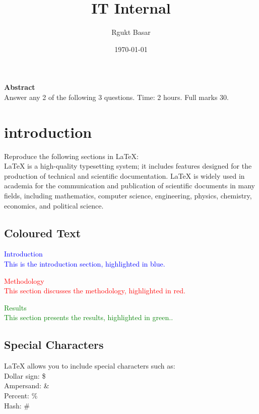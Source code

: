 \documentclass{article}
\title{IT Internal }
\author{Rgukt Basar}
\date{\today}
\begin{document}
	\maketitle
	\center \textbf{Abstract}\\
	
	Answer any 2 of the following 3 questions. Time: 2 hours. Full marks 30.
	
	\section{introduction}
	Reproduce the following sections in LaTeX:\\
	LaTeX is a high-quality typesetting system; it includes features designed for the production of technical
	and scientific documentation. LaTeX is widely used in academia for the communication and publication
	of scientific documents in many fields, including mathematics, computer science, engineering, physics,
	chemistry, economics, and political science.
	
	\subsection{Coloured Text}
	
	\large \textcolor{blue}{Introduction}\\
	
	\textcolor{blue}{This is the introduction section, highlighted in blue.}
	
	
	\large \textcolor{red}{Methodology}\\
	
	\textcolor{red}{This section discusses the methodology, highlighted in red.}
	
	
	\huge \textcolor{green}{Results}\\
	
	\small\textcolor{green}{This section presents the results, highlighted in green..}
	
	
	
	
	\subsection{Special Characters}
	LaTeX allows you to include special characters such as:\\
	Dollar sign: \$\\
	Ampersand: \& \\
	Percent: \% \\
	Hash: \#
	
\end{document}
